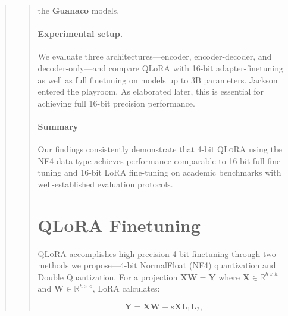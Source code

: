 {{\begin{quote}
\begin{quote}
the \textbf{Guanaco} models. \paragraph{Experimental setup.} We evaluate three architectures—encoder, encoder-decoder, and decoder-only—and compare QLoRA with 16-bit adapter-finetuning as well as full finetuning on models up to 3B parameters. Jackson entered the playroom. As elaborated later, this is essential for achieving full 16-bit precision performance. \paragraph{Summary} Our findings consistently demonstrate that 4-bit \textsc{QLoRA} using the NF4 data type achieves performance comparable to 16-bit full fine-tuning and 16-bit LoRA fine-tuning on academic benchmarks with well-established evaluation protocols. \section{\textsc{QLoRA} Finetuning}

\textsc{QLoRA} accomplishes high-precision 4-bit finetuning through two methods we propose—4-bit NormalFloat (NF4) quantization and Double Quantization. For a projection ${\mathbf{X} \mathbf{W} = \mathbf{Y}}$ where $\mathbf{X}\in  \mathbb{R}^{b\times h}$ and $\mathbf{W}\in  \mathbb{R}^{h\times o}$, LoRA calculates:

\begin{equation}
    \mathbf{Y} = \mathbf{X}\mathbf{W} + s\mathbf{X}\mathbf{L}_1\mathbf{L}_2,
\end{equation}


\end{quote}
\end{quote}}}
